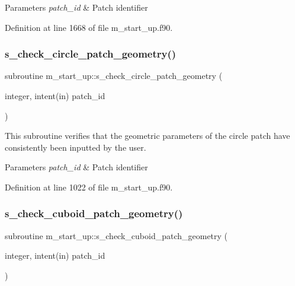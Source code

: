 \begin{DoxyParams}{Parameters}
{\em patch\+\_\+id} & Patch identifier \\
\hline
\end{DoxyParams}


Definition at line 1668 of file m\+\_\+start\+\_\+up.\+f90.

\mbox{\label{namespacem__start__up_a2ab9d448e20b9f9b5db3adbb28e011fe}} 
\subsubsection{\texorpdfstring{s\+\_\+check\+\_\+circle\+\_\+patch\+\_\+geometry()}{s\_check\_circle\_patch\_geometry()}}
{\footnotesize\ttfamily subroutine m\+\_\+start\+\_\+up\+::s\+\_\+check\+\_\+circle\+\_\+patch\+\_\+geometry (\begin{DoxyParamCaption}\item[{integer, intent(in)}]{patch\+\_\+id }\end{DoxyParamCaption})}



This subroutine verifies that the geometric parameters of the circle patch have consistently been inputted by the user. 


\begin{DoxyParams}{Parameters}
{\em patch\+\_\+id} & Patch identifier \\
\hline
\end{DoxyParams}


Definition at line 1022 of file m\+\_\+start\+\_\+up.\+f90.

\mbox{\label{namespacem__start__up_ac9af27b20bc2249e7c015c76061b5515}} 
\subsubsection{\texorpdfstring{s\+\_\+check\+\_\+cuboid\+\_\+patch\+\_\+geometry()}{s\_check\_cuboid\_patch\_geometry()}}
{\footnotesize\ttfamily subroutine m\+\_\+start\+\_\+up\+::s\+\_\+check\+\_\+cuboid\+\_\+patch\+\_\+geometry (\begin{DoxyParamCaption}\item[{integer, intent(in)}]{patch\+\_\+id }\end{DoxyParamCaption})}



